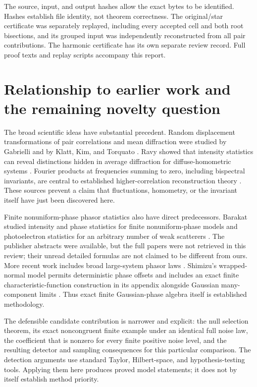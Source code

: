 \documentclass[11pt]{article}
\begin{document}
The source, input, and output hashes allow the exact bytes to be identified.
Hashes establish file identity, not theorem correctness. The original/star
certificate was separately replayed, including every accepted cell and both
root bisections, and its grouped input was independently reconstructed from
all pair contributions. The harmonic certificate has its own separate review
record. Full proof texts and replay scripts accompany this report.

\section{Relationship to earlier work and the remaining novelty question}

The broad scientific ideas have substantial precedent. Random displacement
transformations of pair correlations and mean diffraction were studied by
Gabrielli and by Klatt, Kim, and Torquato \cite{Gabrielli2004,Klatt2020}.
Ravy showed that intensity statistics can reveal distinctions hidden in
average diffraction for diffuse-homometric systems \cite{Ravy2013}.
Fourier products at frequencies summing to zero, including bispectral
invariants, are central to established higher-correlation reconstruction
theory \cite{Jaming2003}. These sources prevent a claim that fluctuations,
homometry, or the invariant itself have just been discovered here.

Finite nonuniform-phase phasor statistics also have direct predecessors.
Barakat studied intensity and phase statistics for finite nonuniform-phase
models and photoelectron statistics for an arbitrary number of weak
scatterers \cite{Barakat1981,Barakat1983,Barakat1988}. The publisher abstracts
were available, but the full papers were not retrieved in this review; their
unread detailed formulas are not claimed to be different from ours.
More recent work includes broad large-system phasor laws
\cite{Metz2024}. Shimizu's wrapped-normal model permits deterministic phase
offsets and includes an exact finite characteristic-function construction
in its appendix alongside Gaussian many-component limits \cite{Shimizu2025}.
Thus exact finite Gaussian-phase algebra itself is established methodology.

The defensible candidate contribution is narrower and explicit: the null
selection theorem, its exact noncongruent finite example under an identical
full noise law, the coefficient that is nonzero for every finite positive
noise level, and the resulting detector and sampling consequences for this
particular comparison. The detection arguments use standard Taylor,
Hilbert-space, and hypothesis-testing tools. Applying them here produces
proved model statements; it does not by itself establish method priority.
\end{document}
